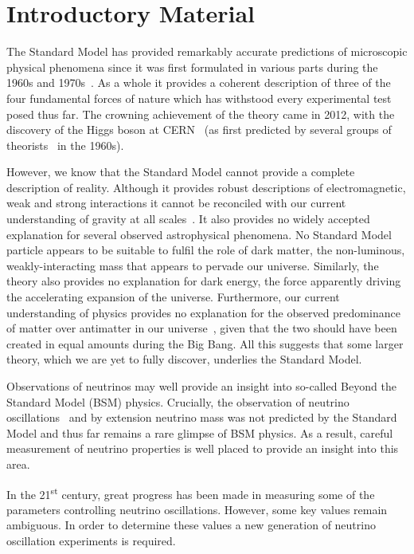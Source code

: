 \chapter{Introductory Material}
\label{sec:intro}

The Standard Model has provided remarkably accurate predictions of microscopic physical phenomena since it was first formulated in various parts during the 1960s and 1970s~\cite{glashow1961, weinberg1967, qcdTheory1, qcdTheory2}.
As a whole it provides a coherent description of three of the four fundamental forces of nature which has withstood every experimental test posed thus far. 
The crowning achievement of the theory came in 2012, with the discovery of the Higgs boson at CERN~\cite{higgsDiscoveryATLAS, higgsDiscoveryCMS} (as first predicted by several groups of theorists~\cite{higgsTheory1, higgsTheory2, higgsTheory3} in the 1960s).

However, we know that the Standard Model cannot provide a complete description of reality.
Although it provides robust descriptions of electromagnetic, weak and strong interactions it cannot be reconciled with our current understanding of gravity at all scales~\cite{quantumGravity}.
It also provides no widely accepted explanation for several observed astrophysical phenomena.
No Standard Model particle appears to be suitable to fulfil the role of dark matter, the non-luminous, weakly-interacting mass that appears to pervade our universe.
Similarly, the theory also provides no explanation for dark energy, the force apparently driving the accelerating expansion of the universe.
Furthermore, our current understanding of physics provides no explanation for the observed predominance of matter over antimatter in our universe~\cite{matterAntimatterAMS}, given that the two should have been created in equal amounts during the Big Bang.
All this suggests that some larger theory, which we are yet to fully discover, underlies the Standard Model.

Observations of neutrinos may well provide an insight into so-called Beyond the Standard Model (BSM) physics.
Crucially, the observation of neutrino oscillations~\cite{SNO, superK} and by extension neutrino mass was not predicted by the Standard Model and thus far remains a rare glimpse of BSM physics.
As a result, careful measurement of neutrino properties is well placed to provide an insight into this area.

In the 21\textsuperscript{st} century, great progress has been made in measuring some of the parameters controlling neutrino oscillations.
However, some key values remain ambiguous.
In order to determine these values a new generation of neutrino oscillation experiments is required.

